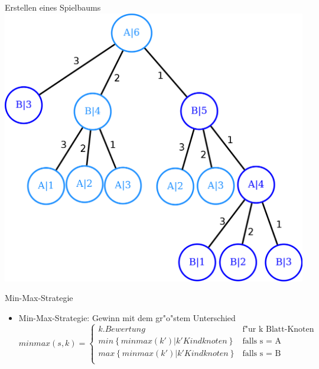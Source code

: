 \documentclass[18pt]{beamer}
\begin{document}
\begin{frame}{Erstellen eines Spielbaums}
\includegraphics[scale=0.4]{baum18.png}
\end{frame}

\begin{frame}{Min-Max-Strategie}
\begin{itemize}
\item Min-Max-Strategie: Gewinn mit dem gr"o"stem Unterschied
\begin{equation}
   minmax(s,k) =
   \begin{cases}
     k.Bewertung & \text{f"ur k Blatt-Knoten} \\
     min\left\{minmax(k') | k' Kindknoten\right\} & \text{falls s = A} \\
     max\left\{minmax(k') | k' Kindknoten\right\} & \text{falls s = B} \\
   \end{cases}
\end{equation}
\end{itemize}
\end{frame}
\end{document}
